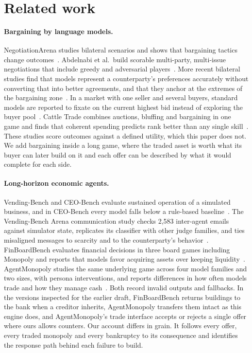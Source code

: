 \section{Related work}
\label{sec:related}

\paragraph{Bargaining by language models.} NegotiationArena studies bilateral scenarios and shows that bargaining tactics change outcomes~\cite{bianchi2024negotiationarena}. Abdelnabi et al.\ build scorable multi-party, multi-issue negotiations that include greedy and adversarial players~\cite{abdelnabi2024stakeholders}. More recent bilateral studies find that models represent a counterparty's preferences accurately without converting that into better agreements, and that they anchor at the extremes of the bargaining zone~\cite{cosentino2026counterparty,shah2025rationalis}. In a market with one seller and several buyers, standard models are reported to fixate on the current highest bid instead of exploring the buyer pool~\cite{liu2026multibuyer}. Cattle Trade combines auctions, bluffing and bargaining in one game and finds that coherent spending predicts rank better than any single skill~\cite{muller2026cattletrade}. These studies score outcomes against a defined utility, which this paper does not. We add bargaining inside a long game, where the traded asset is worth what its buyer can later build on it and each offer can be described by what it would complete for each side.

\paragraph{Long-horizon economic agents.} Vending-Bench and CEO-Bench evaluate sustained operation of a simulated business, and in CEO-Bench every model falls below a rule-based baseline~\cite{backlund2025vendingbench,chen2026ceobench}. The Vending-Bench Arena communication study checks 2,583 inter-agent emails against simulator state, replicates its classifier with other judge families, and ties misaligned messages to scarcity and to the counterparty's behavior~\cite{li2026arena}. FinBoardBench evaluates financial decisions in three board games including Monopoly and reports that models favor acquiring assets over keeping liquidity~\cite{hu2026finboardbench}. AgentMonopoly studies the same underlying game across four model families and two sizes, with persona interventions, and reports differences in how often models trade and how they manage cash~\cite{wu2026agentmonopoly}. Both record invalid outputs and fallbacks. In the versions inspected for the earlier draft, FinBoardBench returns buildings to the bank when a creditor inherits, AgentMonopoly transfers them intact as this engine does, and AgentMonopoly's trade interface accepts or rejects a single offer where ours allows counters. Our account differs in grain. It follows every offer, every traded monopoly and every bankruptcy to its consequence and identifies the response path behind each failure to build.


